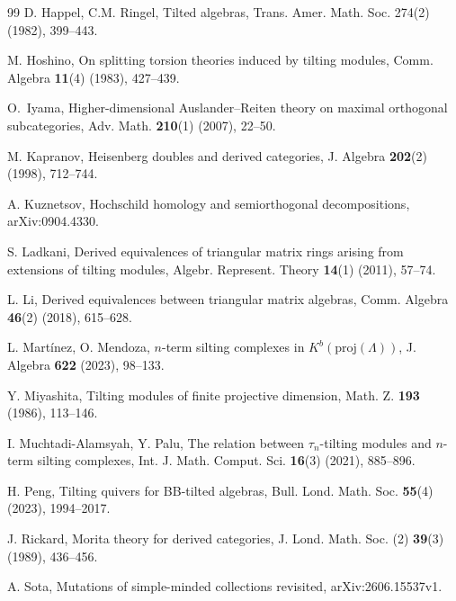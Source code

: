 \documentclass[reqno,12pt]{amsart}
\numberwithin{equation}{section}
\theoremstyle{plain}
\theoremstyle{definition}
\begin{document}
\begin{thebibliography}{99}
 D. Happel, C.M. Ringel,  Tilted algebras, Trans. Amer. Math. Soc. 274(2) (1982), 399--443.


  M. Hoshino, On splitting torsion theories induced by tilting modules, Comm. Algebra {\bf 11}(4) (1983), 427--439.

 O.~Iyama, Higher-dimensional Auslander--Reiten theory on maximal orthogonal subcategories, Adv. Math. {\bf 210}(1) (2007), 22--50.

 M. Kapranov, Heisenberg doubles and derived categories, J. Algebra {\bf 202}(2) (1998), 712--744.

 A. Kuznetsov, Hochschild homology and semiorthogonal decompositions, arXiv:0904.4330.

 {S. Ladkani, Derived equivalences of triangular matrix rings arising from extensions of tilting modules, Algebr. Represent. Theory {\bf 14}(1) (2011), 57--74.}

 {L. Li, Derived equivalences between triangular matrix algebras, Comm. Algebra {\bf 46}(2) (2018), 615--628.}

 L. Mart\'inez, O. Mendoza, $n$-term silting complexes in $K^b(\mathrm{proj}(\Lambda))$, J. Algebra {\bf 622} (2023), 98--133.

 Y. Miyashita, Tilting modules of finite projective dimension, Math. Z. {\bf 193} (1986), 113--146.

 I. Muchtadi-Alamsyah, Y. Palu, The relation between $\tau_n$-tilting modules and $n$-term silting complexes,
Int. J. Math. Comput. Sci. {\bf 16}(3) (2021), 885--896.

 H. Peng, Tilting quivers for BB-tilted algebras, Bull. Lond. Math. Soc. {\bf 55}(4) (2023), 1994--2017.


 {J. Rickard, Morita theory for derived categories, J. Lond. Math. Soc. (2) {\bf 39}(3) (1989), 436--456.}

 A. Sota, Mutations of simple-minded collections revisited, arXiv:2606.15537v1.
\end{thebibliography}
\end{document}
